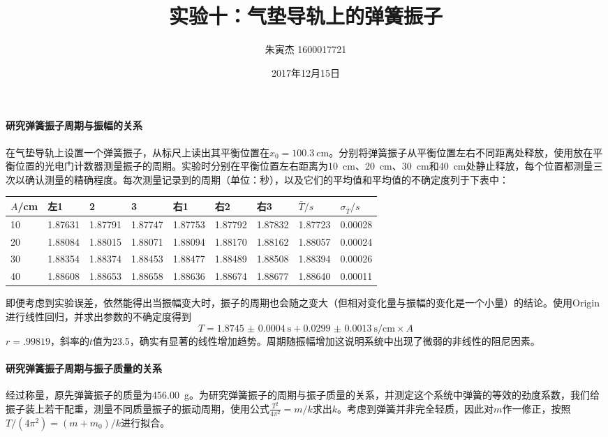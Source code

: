 \documentclass[UTF8]{ctexart}
\title{实验十：气垫导轨上的弹簧振子}
\author{朱寅杰 1600017721}
\date{2017年12月15日}
\begin{document}
\maketitle
\paragraph{研究弹簧振子周期与振幅的关系}
在气垫导轨上设置一个弹簧振子，从标尺上读出其平衡位置在$x_0=\SI{100.3}{\cm}$。分别将弹簧振子从平衡位置左右不同距离处释放，使用放在平衡位置的光电门计数器测量振子的周期。实验时分别在平衡位置左右距离为\SI{10}{\cm}、\SI{20}{\cm}、\SI{30}{\cm}和\SI{40}{\cm}处静止释放，每个位置都测量三次以确认测量的精确程度。每次测量记录到的周期（单位：秒），以及它们的平均值和平均值的不确定度列于下表中：
\begin{center}
\begin{tabu} to \linewidth {X[c]|X[c]X[c]X[c]|X[c]X[c]X[c]|X[c]X[c]}
\hline
$A$/\si{\cm}	&左1	&2	&3	&右1	&右2	&右3	&$\bar{T}/\si{s}$&$\sigma_{\bar{T}}/\si{s}$
\\
	&1.87631	&1.87791	&1.87747	&1.87753	&1.87792	&1.87832	&1.87723	&0.00028\\
20	&1.88084	&1.88015	&1.88071	&1.88094	&1.88170	&1.88162	&1.88057	&0.00024\\
30	&1.88354	&1.88374	&1.88453	&1.88477	&1.88489	&1.88508	&1.88394	&0.00026\\
40	&1.88608	&1.88653	&1.88658	&1.88636	&1.88674	&1.88677	&1.88640	&0.00011\\
\hline
\end{tabu}
\end{center}
即便考虑到实验误差，依然能得出当振幅变大时，振子的周期也会随之变大（但相对变化量与振幅的变化是一个小量）的结论。使用Origin进行线性回归，并求出参数的不确定度得到\[T=\SI{1.8745(4)}{\second}+\SI{0.0299(13)}{\second\per\cm}\times A\]
$r=\num{.99819}$，斜率的$t$值为23.5，确实有显著的线性增加趋势。周期随振幅增加这说明系统中出现了微弱的非线性的阻尼因素。

\paragraph{研究弹簧振子周期与振子质量的关系}
经过称量，原先弹簧振子的质量为\SI{456.00}{\g}。为研究弹簧振子的周期与振子质量的关系，并测定这个系统中弹簧的等效的劲度系数，我们给振子装上若干配重，测量不同质量振子的振动周期，使用公式$\frac{T^2}{4\pi^2}=m/k$求出$k$。考虑到弹簧并非完全轻质，因此对$m$作一修正，按照$T/(4\pi^2)=(m+m_0)/k$进行拟合。
\end{document}
